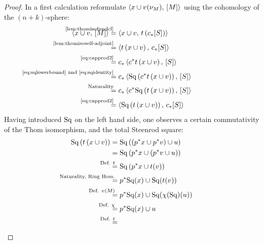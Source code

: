 \begin{Thm}
\begin{proof}
    
    In a first calculation reformulate
    $\left\langle x\cup {v_{}}(\nu_{M}),\, [M] \right\rangle$ using the cohomology of the
    $(n+k)$-sphere:
    \begin{align}\notag
      \capped{x\cup \vu}{\fundcl M}
      &\equalsby{\autoref{lem:thomisofundcl}}
        \capped
        {x\cup\vu}
        {\thomiso\left(\pf\collapse\fundcl{\Sph}\right)}
      \\\notag
      &\equalsby{\autoref{lem:thomisoself-adjoint}}
        \capped
        {\thomiso\left(x\cup\vu\right)}
        {\pf\collapse\fundcl{\Sph}}
      \\\notag
      &\equalsby{\eqref{eq:capprod2}}
        \pf\collapse\capped
        {\pb\collapse\thomiso\left(x\cup\vu\right)}
        {\fundcl{\Sph}}
      \\\notag
      &\equalsby{\eqref{eq:sqlowerbound} and \eqref{eq:sqidentity}}
        \pf\collapse\capped
        {\SQ\left(\pb\collapse\thomiso\left(x\cup\vu\right)\right)}
        {\fundcl{\Sph}}
      \\\notag
      &\equalsby{Naturality}
        \pf\collapse\capped
        {\pb\collapse\SQ\left(\thomiso\left(x\cup\vu\right)\right)}
        {\fundcl{\Sph}}
      \\\label{eq:proofaltdefwuclasses:eq1}
      &\equalsby{\eqref{eq:capprod2}}
        \capped
        {\SQ\left(\thomiso\left(x\cup\vu\right)\right)}
        {\pf\collapse\fundcl{\Sph}}
    \end{align}
    Having introduced $\mathrm{Sq}$ on the left hand side, one observes a
    certain commutativity of the Thom isomorphism, and the total
    Steenrod square:
    \begin{align}\notag
      \SQ\left(\thomiso\left(x\cup\vu\right)\right)
      &=
        \SQ\left(\left(\pb p x\cup \pb p\vu\right) \cup \U\right)
      \\\notag
      &=
        \SQ\left(\pb p x\cup \left(\pb p\vu \cup \U\right)\right)
      \\\notag
      &\equalsby{Def. $\thomiso$}
       \SQ\left(\pb p x\cup \thomiso(\vu)\right)
      \\\notag
      &\equalsby{Naturality, Ring Hom.}
        \pb p\SQ(x) \cup \SQ(\thomiso(\vu))
      \\\notag
      &\equalsby{Def. $\V{M}$}
        \pb p\SQ(x) \cup \SQ(\antipode(\SQ)(u))
      \\\notag
      &\equalsby{Def. $\antipode$}
        \pb p\SQ(x) \cup u
      \\\label{eq:proofaltdefwuclasses:eq2}
      &\equalsby{Def. $\thomiso$}

\end{align}
\end{proof}
\end{Thm}
